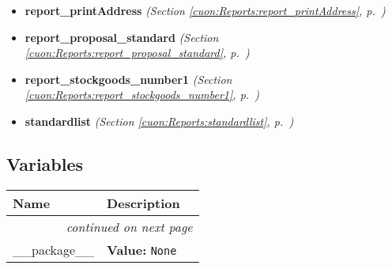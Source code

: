 \begin{itemize}
\item \textbf{report\_printAddress}
  \textit{(Section \ref{cuon:Reports:report_printAddress}, p.~\pageref{cuon:Reports:report_printAddress})}

\item \textbf{report\_proposal\_standard}
  \textit{(Section \ref{cuon:Reports:report_proposal_standard}, p.~\pageref{cuon:Reports:report_proposal_standard})}

\item \textbf{report\_stockgoods\_number1}
  \textit{(Section \ref{cuon:Reports:report_stockgoods_number1}, p.~\pageref{cuon:Reports:report_stockgoods_number1})}

\item \textbf{standardlist}
  \textit{(Section \ref{cuon:Reports:standardlist}, p.~\pageref{cuon:Reports:standardlist})}

\end{itemize}



  \subsection{Variables}

    \vspace{-1cm}
\hspace{\varindent}\begin{longtable}{|p{\varnamewidth}|p{\vardescrwidth}|l}
\cline{1-2}
\cline{1-2} \centering \textbf{Name} & \centering \textbf{Description}& \\
\cline{1-2}
\endhead\cline{1-2}\multicolumn{3}{r}{\small\textit{continued on next page}}\\\endfoot\cline{1-2}
\endlastfoot\raggedright \_\-\_\-p\-a\-c\-k\-a\-g\-e\-\_\-\_\- & \raggedright \textbf{Value:} 
{\tt None}&\\
\cline{1-2}
\end{longtable}

